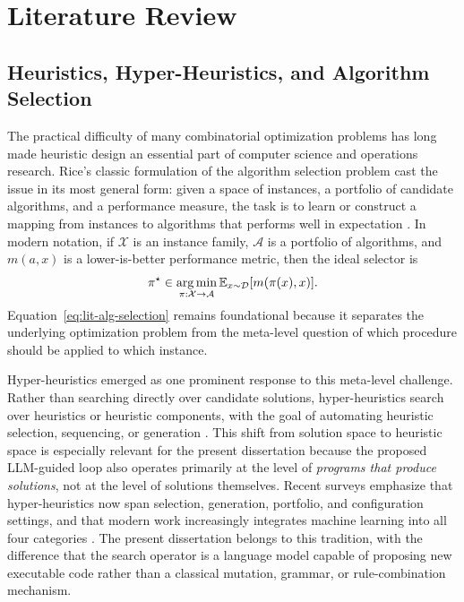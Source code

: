 \chapter{Literature Review}
\label{chap:literature-review}

\section{Heuristics, Hyper-Heuristics, and Algorithm Selection}
\label{sec:lit-heuristics}

The practical difficulty of many combinatorial optimization problems has long made heuristic design
an essential part of computer science and operations research. Rice's classic formulation of the
algorithm selection problem cast the issue in its most general form: given a space of instances, a
portfolio of candidate algorithms, and a performance measure, the task is to learn or construct a
mapping from instances to algorithms that performs well in expectation \cite{rice1976}. In modern
notation, if $\mathcal{X}$ is an instance family, $\mathcal{A}$ is a portfolio of algorithms, and
$m(a,x)$ is a lower-is-better performance metric, then the ideal selector is
\begin{equation}
\pi^{\star} \in \operatorname*{arg\,min}_{\pi : \mathcal{X} \to \mathcal{A}}
\mathbb{E}_{x \sim \mathcal{D}}[m(\pi(x),x)].
\label{eq:lit-alg-selection}
\end{equation}
Equation~\eqref{eq:lit-alg-selection} remains foundational because it separates the underlying
optimization problem from the meta-level question of which procedure should be applied to which
instance.

Hyper-heuristics emerged as one prominent response to this meta-level challenge. Rather than
searching directly over candidate solutions, hyper-heuristics search over heuristics or heuristic
components, with the goal of automating heuristic selection, sequencing, or generation
\cite{burke2013,dokeroglu2024}. This shift from solution space to heuristic space is especially
relevant for the present dissertation because the proposed LLM-guided loop also operates primarily
at the level of \emph{programs that produce solutions}, not at the level of solutions themselves.
Recent surveys emphasize that hyper-heuristics now span selection, generation, portfolio, and
configuration settings, and that modern work increasingly integrates machine learning into all four
categories \cite{dokeroglu2024}. The present dissertation belongs to this tradition, with the
difference that the search operator is a language model capable of proposing new executable code
rather than a classical mutation, grammar, or rule-combination mechanism.

